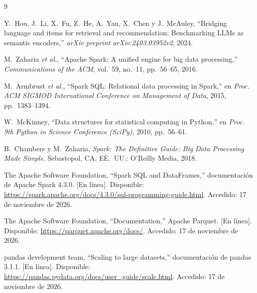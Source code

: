 \documentclass[11pt,a4paper]{article}
\begin{document}
\begin{thebibliography}{9}

Y.~Hou, J.~Li, X.~Fu, Z.~He, A.~Yan, X.~Chen y J.~McAuley, ``Bridging language and items
for retrieval and recommendation: Benchmarking LLMs as semantic encoders,'' \emph{arXiv
preprint arXiv:2403.03952v2}, 2024.

M.~Zaharia \emph{et al.}, ``Apache Spark: A unified engine for big data processing,''
\emph{Communications of the ACM}, vol.~59, no.~11, pp.~56--65, 2016.

M.~Armbrust \emph{et al.}, ``Spark SQL: Relational data processing in Spark,'' en
\emph{Proc. ACM \mbox{SIGMOD} International Conference on Management of Data}, 2015, pp.~1383--1394.

W.~McKinney, ``Data structures for statistical computing in Python,'' en \emph{Proc. 9th
Python in Science Conference (SciPy)}, 2010, pp.~56--61.

B.~Chambers y M.~Zaharia, \emph{Spark: The Definitive Guide: Big Data Processing Made
Simple}. Sebastopol, CA, EE.~UU.:
O'Reilly Media, 2018.

The Apache Software Foundation, ``Spark SQL and DataFrames,'' documentación de Apache
Spark 4.3.0. [En línea]. Disponible:
\url{https://spark.apache.org/docs/4.3.0/sql-programming-guide.html}. Accedido: 17 de
noviembre de 2026.

The Apache Software Foundation, ``Documentation,'' Apache Parquet. [En línea]. Disponible:
\url{https://parquet.apache.org/docs/}. Accedido: 17 de noviembre de 2026.

pandas development team, ``Scaling to large datasets,'' documentación de pandas 3.1.1.
[En línea]. Disponible: \url{https://pandas.pydata.org/docs/user_guide/scale.html}.
Accedido: 17 de noviembre de 2026.

\end{thebibliography}
\end{document}
